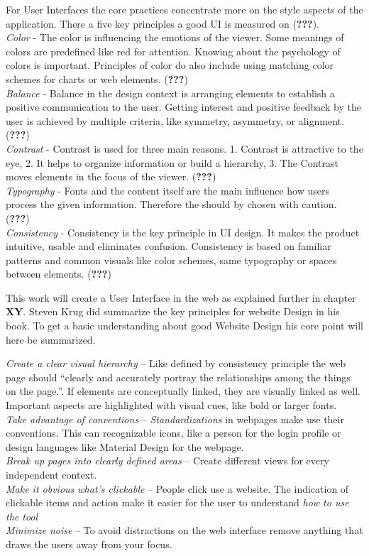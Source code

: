 \documentclass[american,a4paper,oneside,,tablecaptionabove]{scrbook}
\begin{document}
For User Interfaces the core practices concentrate more on the style
aspects of the application. There a five key principles a good UI is
measured on ({\textbf{???}}).\\
\emph{Color} - The color is influencing the emotions of the viewer. Some
meanings of colors are predefined like red for attention. Knowing about
the psychology of colors is important. Principles of color do also
include using matching color schemes for charts or web elements.
({\textbf{???}})\\
\emph{Balance} - Balance in the design context is arranging elements to
establish a positive communication to the user. Getting interest and
positive feedback by the user is achieved by multiple criteria, like
symmetry, asymmetry, or alignment. ({\textbf{???}})\\
\emph{Contrast} - Contrast is used for three main reasons. 1. Contrast
is attractive to the eye, 2. It helps to organize information or build a
hierarchy, 3. The Contrast moves elements in the focus of the viewer.
({\textbf{???}})\\
\emph{Typography} - Fonts and the content itself are the main influence
how users process the given information. Therefore the should by chosen
with caution. ({\textbf{???}})\\
\emph{Consistency} - Consistency is the key principle in UI design. It
makes the product intuitive, usable and eliminates confusion.
Consistency is based on familiar patterns and common visuals like color
schemes, same typography or spaces between elements. ({\textbf{???}})

This work will create a User Interface in the web as explained further
in chapter \textbf{XY}. Steven Krug did summarize the key principles for
website Design in his book. To get a basic understanding about good
Website Design his core point will here be summarized.

\emph{Create a clear visual hierarchy} -- Like defined by consistency
principle the web page should \enquote{clearly and accurately portray
the relationships among the things on the page.}. If elements are
conceptually linked, they are visually linked as well. Important aspects
are highlighted with visual cues, like bold or larger fonts.\\
\emph{Take advantage of conventions} -- \emph{Standardizations} in
webpages make use their conventions. This can recognizable icons, like a
person for the login profile or design languages like Material Design
for the webpage.\\
\emph{Break up pages into clearly defined areas} -- Create different
views for every independent context.\\
\emph{Make it obvious what's clickable} -- People click use a website.
The indication of clickable items and action make it easier for the user
to understand \emph{how to use the tool}\\
\emph{Minimize noise} -- To avoid distractions on the web interface
remove anything that draws the users away from your focus.
\end{document}
